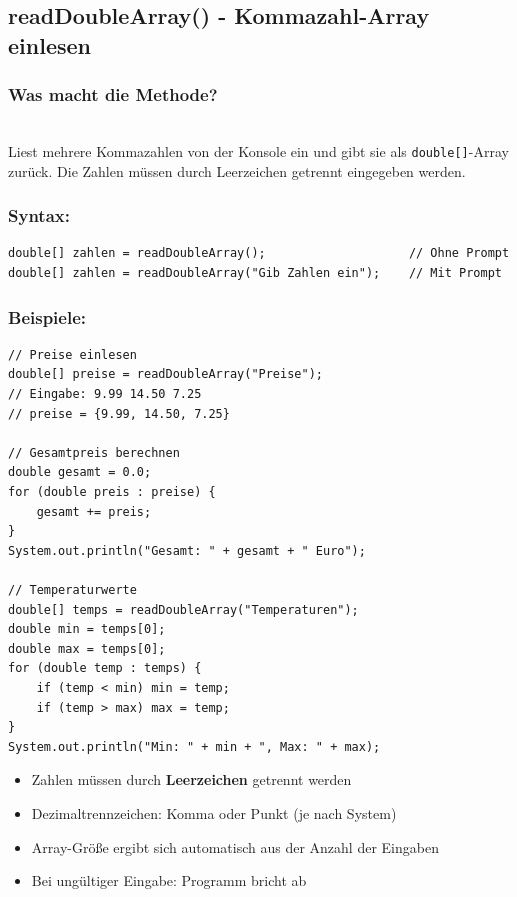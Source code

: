 \newpage


\subsection*{readDoubleArray() - Kommazahl-Array einlesen}

\subsubsection*{Was macht die Methode?}\\
Liest mehrere Kommazahlen von der Konsole ein und gibt sie als \texttt{double[]}-Array zurück.
Die Zahlen müssen durch Leerzeichen getrennt eingegeben werden.

\subsubsection*{Syntax:}
\begin{lstlisting}
double[] zahlen = readDoubleArray();                    // Ohne Prompt
double[] zahlen = readDoubleArray("Gib Zahlen ein");    // Mit Prompt
\end{lstlisting}

\subsubsection*{Beispiele:}
\begin{lstlisting}
// Preise einlesen
double[] preise = readDoubleArray("Preise");
// Eingabe: 9.99 14.50 7.25
// preise = {9.99, 14.50, 7.25}

// Gesamtpreis berechnen
double gesamt = 0.0;
for (double preis : preise) {
    gesamt += preis;
}
System.out.println("Gesamt: " + gesamt + " Euro");

// Temperaturwerte
double[] temps = readDoubleArray("Temperaturen");
double min = temps[0];
double max = temps[0];
for (double temp : temps) {
    if (temp < min) min = temp;
    if (temp > max) max = temp;
}
System.out.println("Min: " + min + ", Max: " + max);
\end{lstlisting}

\begin{achtung}
	\begin{itemize}
		\item Zahlen müssen durch \textbf{Leerzeichen} getrennt werden
		\item Dezimaltrennzeichen: Komma oder Punkt (je nach System)
		\item Array-Größe ergibt sich automatisch aus der Anzahl der Eingaben
		\item Bei ungültiger Eingabe: Programm bricht ab
	\end{itemize}
\end{achtung}

